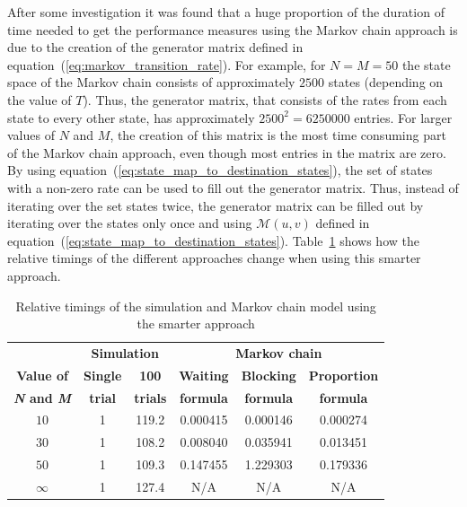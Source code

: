 After some investigation it was found that a huge proportion of the duration of
time needed to get the performance measures using the Markov chain approach is
due to the creation of the generator matrix defined in
equation~(\ref{eq:markov_transition_rate}).
For example, for \(N = M = 50\) the state space of the Markov chain consists
of approximately \(2500\) states (depending on the value of \(T\)).
Thus, the generator matrix, that consists of the rates from each state to every
other state, has approximately \(2500^2 = 6250000\) entries.
For larger values of \(N\) and \(M\), the creation of this matrix is the most
time consuming part of the Markov chain approach, even though most entries in
the matrix are zero.
By using equation~(\ref{eq:state_map_to_destination_states}), the set of states
with a non-zero rate can be used to fill out the generator matrix.
Thus, instead of iterating over the set states twice, the generator matrix can
be filled out by iterating over the states only once and using
\(\mathcal{M}(u,v)\) defined in
equation~(\ref{eq:state_map_to_destination_states}).
Table~\ref{tab:truncation_effect_timings_new} shows how the relative timings
of the different approaches change when using this smarter approach.


\tiny
\begin{table}[H]
    \centering
    \begin{tabular}{c|cc|ccc}
        & \multicolumn{2}{c}{\textbf{Simulation}} & 
        \multicolumn{3}{c}{\textbf{Markov chain}} \\
        \textbf{Value of} & \textbf{Single} & \textbf{100} & 
        \textbf{Waiting} & \textbf{Blocking} & 
        \textbf{Proportion} \\
        \textbf{\textit{N} and \textit{M}} & \textbf{trial} & \textbf{trials} & 
        \textbf{formula} & \textbf{formula} & \textbf{formula} \\
        \hline
        \(10\) & 1 & 119.2 & 0.000415 & 0.000146 & 0.000274 \\
        \hline
        \(30\) & 1 & 108.2 & 0.008040 & 0.035941 & 0.013451 \\
        \hline
        \(50\) & 1 & 109.3 & 0.147455 & 1.229303 & 0.179336 \\
        \hline
        \(\infty\) & 1 & 127.4 & N/A & N/A & N/A \\
    \end{tabular}
    \caption{Relative timings of the simulation and Markov chain model using
    the smarter approach}
    \label{tab:truncation_effect_timings_new}
\end{table}
\normalsize

